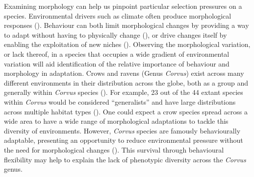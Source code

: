 \documentclass[10pt,a4paper]{article}
\begin{document}
Examining morphology can help us pinpoint particular selection pressures on a species.
Environmental drivers such as climate often produce morphological responses ().
Behaviour can both limit morphological changes by providing a way to adapt without having to physically change (), or drive changes itself by enabling the exploitation of new niches ().
Observing the morphological variation, or lack thereof, in a species that occupies a wide gradient of environmental variation will aid identification of the relative importance of behaviour and morphology in adaptation.
Crows and ravens (Genus \emph{Corvus}) exist across many different environments in their distribution across the globe, both as a group and generally within \emph{Corvus} species ().
For example, 23 out of the 44 extant species within \emph{Corvus} would be considered ``generalists'' and have large distributions across multiple habitat types ().
One could expect a crow species spread across a wide area to have a wide range of morphological adaptations to tackle this diversity of environments.
However, \emph{Corvus} species are famously behaviourally adaptable, presenting an opportunity to reduce environmental pressure without the need for morphological changes ().
This survival through behavioural flexibility may help to explain the lack of phenotypic diversity across the \emph{Corvus} genus.
\end{document}
